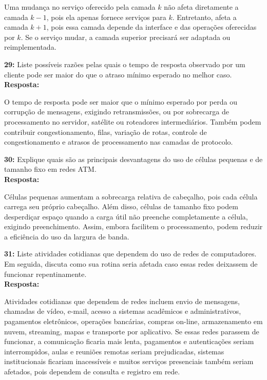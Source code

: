 \documentclass[12pt,a4paper]{report}
\begin{document}
Uma mudança no serviço oferecido pela camada \(k\) não afeta diretamente a camada \(k-1\), pois ela apenas fornece serviços para \(k\). Entretanto, afeta a camada \(k+1\), pois essa camada depende da interface e das operações oferecidas por \(k\). Se o serviço mudar, a camada superior precisará ser adaptada ou reimplementada.

\vspace{0.6cm}

\noindent \textbf{29:} Liste possíveis razões pelas quais o tempo de resposta observado por um cliente pode ser maior do que o atraso mínimo esperado no melhor caso. \\
\textbf{Resposta:}

O tempo de resposta pode ser maior que o mínimo esperado por perda ou corrupção de mensagens, exigindo retransmissões, ou por sobrecarga de processamento no servidor, satélite ou roteadores intermediários. Também podem contribuir congestionamento, filas, variação de rotas, controle de congestionamento e atrasos de processamento nas camadas de protocolo.

\vspace{0.6cm}

\noindent \textbf{30:} Explique quais são as principais desvantagens do uso de células pequenas e de tamanho fixo em redes ATM. \\
\textbf{Resposta:}

Células pequenas aumentam a sobrecarga relativa de cabeçalho, pois cada célula carrega seu próprio cabeçalho. Além disso, células de tamanho fixo podem desperdiçar espaço quando a carga útil não preenche completamente a célula, exigindo preenchimento. Assim, embora facilitem o processamento, podem reduzir a eficiência do uso da largura de banda.

\vspace{0.6cm}

\noindent \textbf{31:} Liste atividades cotidianas que dependem do uso de redes de computadores. Em seguida, discuta como sua rotina seria afetada caso essas redes deixassem de funcionar repentinamente. \\
\textbf{Resposta:}

Atividades cotidianas que dependem de redes incluem envio de mensagens, chamadas de vídeo, e-mail, acesso a sistemas acadêmicos e administrativos, pagamentos eletrônicos, operações bancárias, compras on-line, armazenamento em nuvem, streaming, mapas e transporte por aplicativo. Se essas redes parassem de funcionar, a comunicação ficaria mais lenta, pagamentos e autenticações seriam interrompidos, aulas e reuniões remotas seriam prejudicadas, sistemas institucionais ficariam inacessíveis e muitos serviços presenciais também seriam afetados, pois dependem de consulta e registro em rede.
\end{document}
